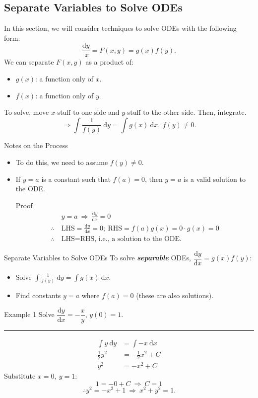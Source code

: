 \documentclass[12pt,a4paper]{article}
\def\d{{\mathrm{d}}}
\begin{document}
\subsection{Separate Variables to Solve ODEs}\label{Separate}
In this section, we will consider techniques to solve ODEs with the following form: 
$$\frac{\d y}{\ x}=F(x,y)=\boxed{g(x)f(y)}.$$
We can separate $F(x,y)$ as a product of: 
\begin{itemize}
	\item $g(x)$: a function only of $x$.
	\item $f(x)$: a function only of $y$.
\end{itemize}
To solve, move $x$-stuff to one side and $y$-stuff to the other side. Then, integrate. 
$$\Rightarrow \int\frac{1}{f(y)}\ \d y=\int g(x)\ \d x,\ f(y)\neq 0.$$ 
\begin{ext}{Notes on the Process}
	\begin{itemize}
		\item To do this, we need to assume $f(y)\neq 0$. 
		\item If $y=a$ is a constant such that $f(a)=0$, then $y=a$ is a valid solution to the ODE. 
		\begin{prf}{Proof}
			$$\begin{aligned}
				&y=a\ \Rightarrow\ \frac{\d y}{\d x}=0\\
				\therefore\ &\text{LHS}=\frac{\d y}{\d x}=0;\ \text{RHS}=f(a)g(x)=0\cdot g(x)=0\\
				\therefore\ &\text{LHS}=\text{RHS,\ i.e.,\ a solution to the ODE.}
			\end{aligned}$$
		\end{prf}
	\end{itemize}
\end{ext}
\begin{thm}{Separate Variables to Solve ODEs}
	To solve \textbf{\textit{separable}} ODEs, $\dfrac{\d y}{\d x}=g(x)f(y)$: 
	\begin{itemize}
		\item Solve $\displaystyle\int\frac{1}{f(y)}\ \d y=\int g(x)\ \d x$.
		\item Find constants $y=a$ where $f(a)=0$ (these are also solutions).
	\end{itemize}
\end{thm}
\begin{eg}{Example 1}
	Solve $\dfrac{\d y}{\d x}=-\dfrac{x}{y}$, $y(0)=1$.\\
	\noindent\rule[0.25\baselineskip]{\textwidth}{1pt}
	$$\begin{aligned}
		\int y\ \d y&=\int-x\ \d x\\
		\frac{1}{2}y^2&=-\frac{1}{2}x^2+C\\
		y^2&=-x^2+C
	\end{aligned}$$
	Substitute $x=0,\ y=1$: 
	$$1=-0+C\ \Rightarrow\ C=1$$
	$$\therefore y^2=-x^2+1\ \Rightarrow\ x^2+y^2=1.$$
\end{eg}
\end{document}
